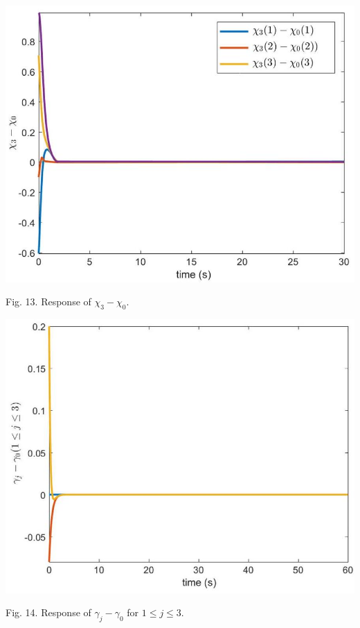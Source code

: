 \documentclass[10pt]{article}
\begin{document}
\begin{center}
\includegraphics[max width=\textwidth]{2023_10_07_a50fd94fd281fe9896c1g-09(5)}
\end{center}

Fig. 13. Response of $\chi_{3}-\chi_{0}$.

\begin{center}
\includegraphics[max width=\textwidth]{2023_10_07_a50fd94fd281fe9896c1g-09(3)}
\end{center}

Fig. 14. Response of $\gamma_{j}-\gamma_{0}$ for $1 \leq j \leq 3$.
\end{document}

